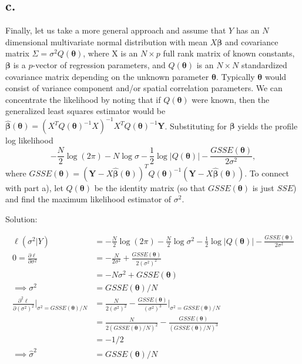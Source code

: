 \documentclass[
  letterpaper,
  DIV=11,
  numbers=noendperiod]{scrreprt}
\begin{document}
\hypertarget{c.}{%
\subsection{c.}\label{c.}}

Finally, let us take a more general approach and assume that \(Y\) has
an \(N\) dimensional multivariate normal distribution with mean
\(X \mathbf{\beta}\) and covariance matrix
\(\Sigma = \sigma^2 Q(\boldsymbol{\theta})\), where X is an
\(N\times p\) full rank matrix of known constants, \(\boldsymbol \beta\)
is a \(p\)-vector of regression parameters, and
\(Q(\boldsymbol{\theta})\) is an \(N\times N\) standardized covariance
matrix depending on the unknown parameter \(\boldsymbol{\theta}\).
Typically \(\boldsymbol{\theta}\) would consist of variance component
and/or spatial correlation parameters. We can concentrate the likelihood
by noting that if \(Q(\boldsymbol{\theta})\) were known, then the
generalized least squares estimator would be
\(\boldsymbol{\hat \beta(\theta)} =(X^T Q(\boldsymbol{\theta})^{-1}X)^{-1}X^TQ(\boldsymbol{\theta})^{-1} \mathbf Y\).
Substituting for \(\boldsymbol \beta\) yields the profile log likelihood
\[-\frac{N}{2} \log(2\pi) - N \log \sigma- \frac{1}{2} \log |Q(\boldsymbol{\theta})| - \frac{GSSE(\boldsymbol{\theta})}{2\sigma^2},\]
where
\(GSSE(\boldsymbol{\theta}) =(\mathbf Y - X \boldsymbol{\hat{\beta}}(\boldsymbol{\theta}))^T Q(\boldsymbol{\theta})^{-1}(\mathbf Y -X\boldsymbol{\hat \beta}(\boldsymbol{\theta}))\).
To connect with part a), let \(Q(\boldsymbol{\theta})\) be the identity
matrix (so that \(GSSE(\boldsymbol{\theta})\) is just \(SSE\)) and find
the maximum likelihood estimator of \(\sigma^2\).

Solution:

\[
\begin{aligned}
\ell(\sigma^2 | Y) &= -\frac{N}{2} \log(2\pi) - \frac{N}{2} \log \sigma^2- \frac{1}{2} \log |Q(\boldsymbol{\theta})| - \frac{GSSE(\boldsymbol{\theta})}{2\sigma^2} \\
0=\frac{\partial \ell}{\partial \sigma^2} &= - \frac{N}{2 \sigma^2}+ \frac{GSSE(\boldsymbol{\theta})}{2(\sigma^2)^2}\\
&=-N\sigma^2 +GSSE(\boldsymbol \theta) \\
\implies \sigma^2 &= GSSE(\boldsymbol \theta)/N \\
\frac{\partial^2 \ell}{\partial (\sigma^2)^2} \bigg|_{\sigma^2=GSSE(\boldsymbol \theta)/N}&= \frac{N}{2 (\sigma^2)^2}-\frac{GSSE(\boldsymbol{\theta})}{(\sigma^2)^3}\bigg|_{\sigma^2=GSSE(\boldsymbol \theta)/N}\\
&= \frac{N}{2 (GSSE(\boldsymbol \theta)/N)^2}-\frac{GSSE(\boldsymbol{\theta})}{(GSSE(\boldsymbol \theta)/N)^3} \\
&= -1/2 \\
\implies \hat \sigma^2 &= GSSE(\boldsymbol \theta)/N \\
\end{aligned}
\] \newpage 
\end{document}
